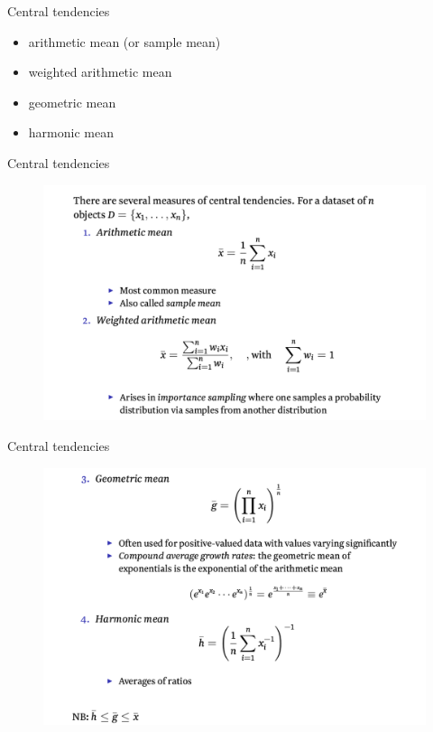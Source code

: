 \documentclass{beamer}
\begin{document}
\begin{frame}{Central tendencies}

	\begin{itemize}
		\item arithmetic mean (or sample mean)
		\item weighted arithmetic mean
		\item geometric mean
		\item harmonic mean
	\end{itemize}

\end{frame}

\begin{frame}{Central tendencies}
	\begin{figure}
		\includegraphics[width=0.9\linewidth]{mean1.png}
	\end{figure}
\end{frame}

\begin{frame}{Central tendencies}
	\begin{figure}
        	\includegraphics[width=0.8\linewidth]{mean2.png}
	\end{figure}
\end{frame}
\end{document}
